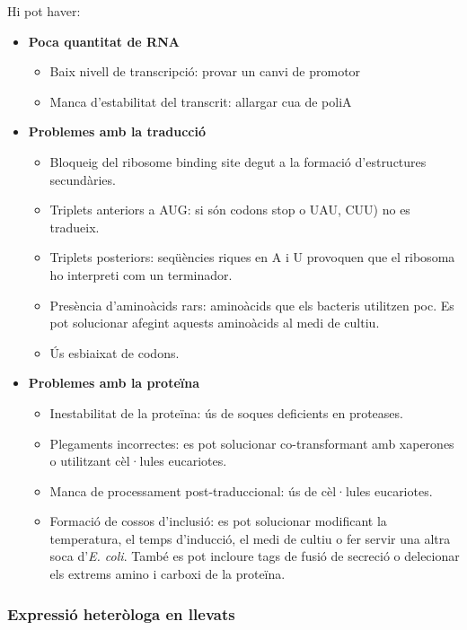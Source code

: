 Hi pot haver:
\begin{itemize}
\item \textbf{Poca quantitat de RNA}
  \begin{itemize}
  \item Baix nivell de transcripció: provar un canvi de promotor
  \item Manca d'estabilitat del transcrit: allargar cua de poliA
  \end{itemize}

\item \textbf{Problemes amb la traducció}
  \begin{itemize}
  \item Bloqueig del ribosome binding site degut a la formació
    d'estructures secundàries.
  \item Triplets anteriors a AUG: si són codons stop o UAU, CUU) no es
    tradueix.
  \item Triplets posteriors: seqüències riques en A i U provoquen que
    el ribosoma ho interpreti com un terminador.
  \item Presència d'aminoàcids rars: aminoàcids que els bacteris
    utilitzen poc. Es pot solucionar afegint aquests aminoàcids al
    medi de cultiu.
  \item Ús esbiaixat de codons.
  \end{itemize}

\item \textbf{Problemes amb la proteïna}
  \begin{itemize}
  \item Inestabilitat de la proteïna: ús de soques deficients en proteases.
  \item Plegaments incorrectes: es pot solucionar co-transformant amb
    xaperones o utilitzant cèl·lules eucariotes.
  \item Manca de processament post-traduccional: ús de cèl·lules eucariotes.
  \item Formació de cossos d'inclusió: es pot solucionar modificant la
    temperatura, el temps d'inducció, el medi de cultiu o fer servir
    una altra soca d'\textit{E. coli}. També es pot incloure tags de
    fusió de secreció o delecionar els extrems amino i carboxi de la
    proteïna.
  \end{itemize}
\end{itemize}

\subsubsection{Expressió heteròloga en llevats}
\label{sec:expr-heter-en}

